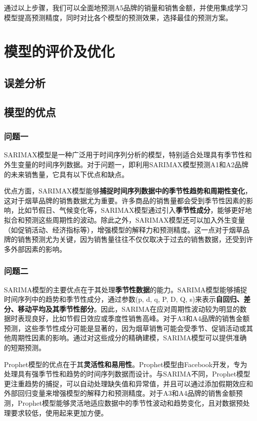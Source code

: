 \documentclass[a4paper]{article}
\begin{document}
	通过以上步骤，我们可以全面地预测A5品牌的销量和销售金额，并使用集成学习模型提高预测精度，同时对比各个模型的预测效果，选择最佳的预测方案。
	\section{模型的评价及优化}
	\subsection{误差分析}
	\subsection{模型的优点}
	\subsubsection{问题一}
	SARIMAX模型是一种广泛用于时间序列分析的模型，特别适合处理具有季节性和外生变量的时间序列数据。对于问题一，即利用SARIMAX模型预测A1和A2品牌的未来销售量，它具有以下优点和缺点。

	优点方面，SARIMAX模型能够\textbf{捕捉时间序列数据中的季节性趋势和周期性变化}，这对于烟草品牌的销售数据尤为重要。许多商品的销售量都会受到季节性因素的影响，比如节假日、气候变化等，SARIMAX模型通过引入\textbf{季节性成分}，能够更好地拟合和预测这些周期性的波动。除此之外，SARIMAX模型还可以加入外生变量（如促销活动、经济指标等），增强模型的解释力和预测精度。这一点对于烟草品牌的销售预测尤为关键，因为销售量往往不仅仅取决于过去的销售数据，还受到许多外部因素的影响。

	\subsubsection{问题二}
	SARIMA模型的主要优点在于其处理\textbf{季节性数据}的能力。SARIMA模型能够捕捉时间序列中的趋势和季节性成分，通过参数(p, d, q, P, D, Q, s)来表示\textbf{自回归、差分、移动平均及其季节性部分}。因此，SARIMA在应对周期性波动较为明显的数据时表现良好，比如节假日效应或季度性销售高峰。对于A3和A4品牌的销售金额预测，这些季节性成分可能是显著的，因为烟草销售可能会受季节、促销活动或其他周期性因素的影响。通过对这些成分的精确建模，SARIMA模型可以提供准确的短期预测。
	
	Prophet模型的优点在于其\textbf{灵活性和易用性}。Prophet模型由Facebook开发，专为处理具有强季节性和趋势的时间序列数据而设计。与SARIMA不同，Prophet模型更注重趋势的捕捉，可以自动处理缺失值和异常值，并且可以通过添加假期效应和外部回归变量来增强模型的解释力和预测精度。对于A3和A4品牌的销售金额预测，Prophet模型能够灵活地适应数据中的季节性波动和趋势变化，且对数据预处理要求较低，使用起来更加方便。
	
\end{document}
